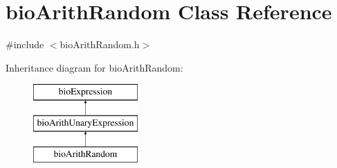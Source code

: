 \hypertarget{classbio_arith_random}{}\section{bio\+Arith\+Random Class Reference}
\label{classbio_arith_random}


{\ttfamily \#include $<$bio\+Arith\+Random.\+h$>$}

Inheritance diagram for bio\+Arith\+Random\+:\begin{figure}[H]
\begin{center}
\leavevmode
\includegraphics[height=3.000000cm]{classbio_arith_random}
\end{center}
\end{figure}
